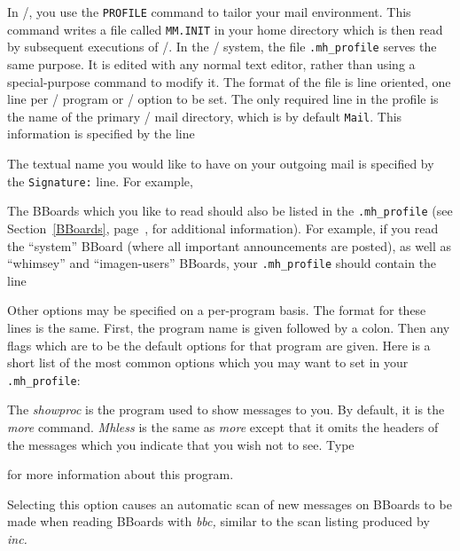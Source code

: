 In \MM/, you use the {\tt PROFILE} command to tailor your mail environment.
This command writes a file called {\tt MM.INIT} in your home directory which
is then read by subsequent executions of \MM/.  In the \MH/ system, the file
\verb|.mh_profile| serves the same purpose.  It is edited with any normal
text editor, rather than using a special-purpose command to modify it.  The
format of the file is line oriented, one line per \MH/ program or \MH/
option to be set.  The only required line in the profile is the name of the
primary \MH/ mail directory, which is by default {\tt Mail}. This
information is specified by the line


The textual name you would like to have on your outgoing mail is specified
by the {\tt Signature:} line.  For example,


The BBoards which you like to read should also be listed in the
\verb|.mh_profile| (see Section~\ref{BBoards}, page~\pageref{BBoards}, for
additional information).  For example, if you read the ``system'' BBoard
(where all important announcements are posted), as well as ``whimsey''
and ``imagen-users'' BBoards, your \verb|.mh_profile| should contain the line


Other options may be specified on a per-program basis.  The format for these
lines is the same.  First, the program name is given followed by a colon.
Then any flags which are to be the default options for that program are
given.  Here is a short list of the most common options which you may want
to set in your \verb|.mh_profile|:


The {\it showproc\/} is the program used to show messages to you.  By
default, it is the {\it more\/} command.  {\it Mhless\/} is the same as
{\it more\/} except that it omits the headers of the messages which you
indicate that you wish not to see.  Type


for more information about this program.


Selecting this option causes an automatic scan of new messages on BBoards to be
made when reading BBoards with {\it bbc,} similar to the scan listing
produced by {\it inc.}

